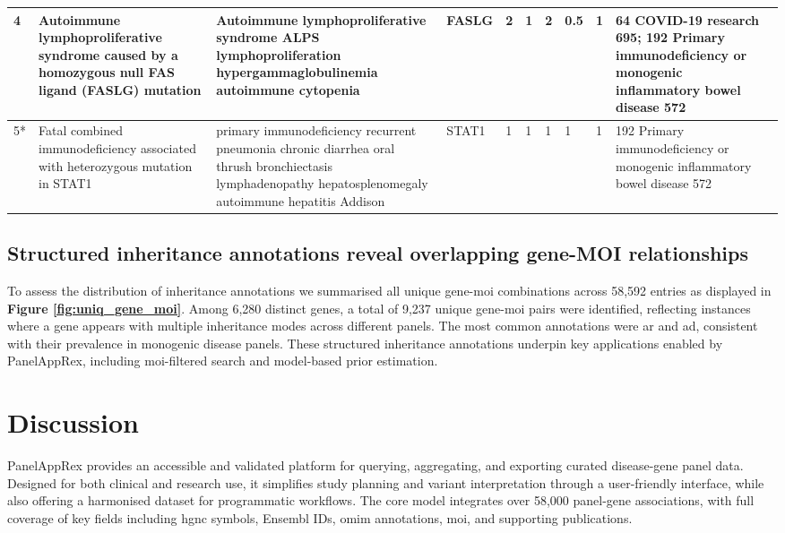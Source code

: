 \begin{table}[htbp]
{\begin{tabular}{|
    p{1cm}|
    p{4cm}|
    p{4cm}|
    p{1.4cm}|
    p{1.3cm}|
    p{1.3cm}|
    p{1.3cm}|
    p{1.3cm}|
    p{1.3cm}|
    p{5cm}|}
\hline																			
4	\cite{magerus-chatinet_autoimmune_2013}	 & 	Autoimmune lymphoproliferative syndrome caused by a homozygous null FAS ligand (FASLG) mutation	 & 	Autoimmune lymphoproliferative syndrome ALPS lymphoproliferation hypergammaglobulinemia autoimmune cytopenia	 & 	FASLG	 & 	2	 & 	1	 & 	2	 & 	0.5	 & 	1	 & 	64 COVID-19 research 695; 192 Primary immunodeficiency or monogenic inflammatory bowel disease 572 \\
\hline																			
5*	\cite{sharfe_fatal_2014}	 & 	Fatal combined immunodeficiency associated with heterozygous mutation in STAT1	 & 	primary immunodeficiency recurrent pneumonia chronic diarrhea oral thrush bronchiectasis lymphadenopathy hepatosplenomegaly autoimmune hepatitis Addison	 & 	STAT1	 & 	1	 & 	1	 & 	1	 & 	1	 & 	1	 & 	192 Primary immunodeficiency or monogenic inflammatory bowel disease 572 \\
\hline
\end{tabular}
}
\end{table}

\subsection{Structured inheritance annotations reveal overlapping gene-MOI relationships}

To assess the distribution of inheritance annotations we summarised all unique gene-\ac{moi} combinations across 58,592 entries as displayed in 
\textbf{Figure \ref{fig:uniq_gene_moi}}. Among 6,280 distinct genes, a total of 9,237 unique gene-\ac{moi} pairs were identified, reflecting instances where a gene appears with multiple inheritance modes across different panels. 
The most common annotations were \ac{ar} and \ac{ad}, consistent with their prevalence in monogenic disease panels. 
These structured inheritance annotations underpin key applications 
enabled by PanelAppRex, including \ac{moi}-filtered search and model-based prior estimation.


\FloatBarrier
\section{Discussion}
\noindent
PanelAppRex provides an accessible and validated platform for querying, aggregating, and exporting curated disease-gene panel data. Designed for both clinical and research use, it simplifies study planning and variant interpretation through a user-friendly interface, while also offering a harmonised dataset for programmatic workflows. The core model integrates over 58,000 panel-gene associations, with full coverage of key fields including \ac{hgnc} symbols, Ensembl IDs, \ac{omim} annotations, \ac{moi}, and supporting publications.

